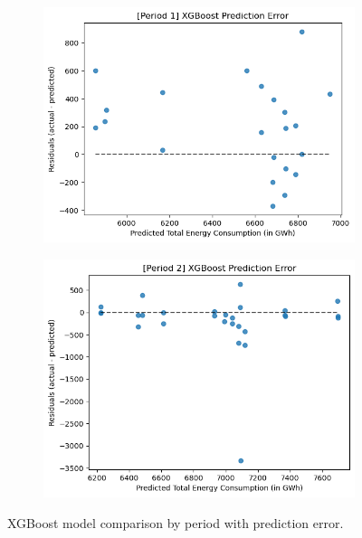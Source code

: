 \documentclass[runningheads]{llncs}
\begin{document}
\begin{center}
\begin{figure}[h]
\begin{subfigure}[h]{0.6\textwidth}
         \caption{}
         \label{fig:resultXGB-p2}
    \end{subfigure}
    \begin{subfigure}[h]{0.60\textwidth}
         \centering
         \hspace*{-1.3in}
         \includegraphics[width=\textwidth]{results/xgboost/erp1.png}
         \caption{}
         \label{fig:errorXGB-p1}
    \end{subfigure}
    \begin{subfigure}[h]{0.60\textwidth}
         \centering
         \hspace*{-1.3in}
         \includegraphics[width=\textwidth]{results/xgboost/erp2.png}
         \caption{}
         \label{fig:errorXGB-p2}
    \end{subfigure}
    \caption{XGBoost model comparison by period with prediction error.}
    \label{fig:xgboostwitherror}
\end{figure}
\end{center}
\end{document}
